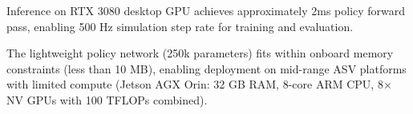 Inference on RTX 3080 desktop GPU achieves approximately 2ms policy forward pass, enabling 500 Hz simulation step rate for training and evaluation.

The lightweight policy network (250k parameters) fits within onboard memory constraints (less than 10 MB), enabling deployment on mid-range ASV platforms with limited compute (Jetson AGX Orin: 32 GB RAM, 8-core ARM CPU, 8× NV GPUs with 100 TFLOPs combined).
